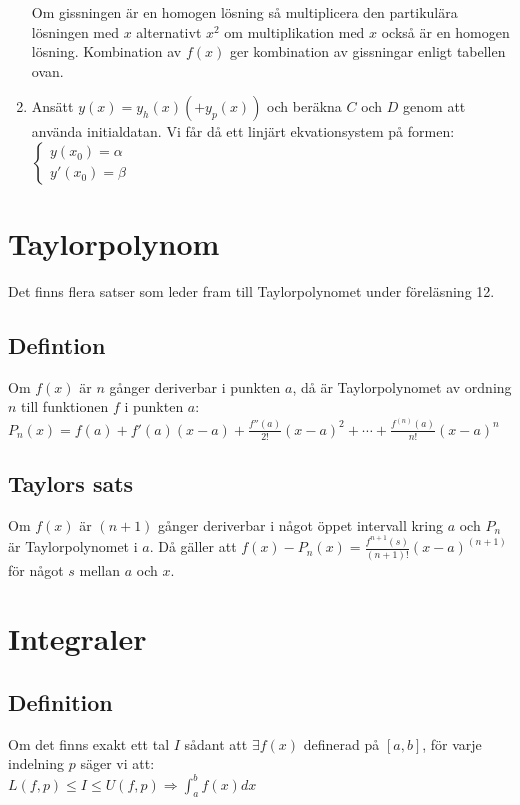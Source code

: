 \documentclass{article}
\begin{document}
\begin{enumerate}
   Om gissningen är en homogen lösning så multiplicera den partikulära lösningen med $x$ alternativt $x^2$ om multiplikation med $x$ också är en homogen lösning. Kombination av $f(x)$ ger kombination av gissningar enligt tabellen ovan.
   \item Ansätt $y(x)=y_{h}(x)(+y_{p}(x))$ och beräkna $C$ och $D$ genom att använda initialdatan. Vi får då ett linjärt ekvationsystem på formen:\\
   $\left\{
   \begin{array}{l}
       y(x_{0})=\alpha \\
       y'(x_{0})=\beta
   \end{array}
   \right.$
\end{enumerate}

\newpage
\section{Taylorpolynom}
Det finns flera satser som leder fram till Taylorpolynomet under föreläsning 12.
\subsection{Defintion}
Om $f(x)$ är $n$ gånger deriverbar i punkten $a$, då är Taylorpolynomet av ordning $n$ till funktionen $f$ i punkten $a$:\\
$P_{n}(x)=f(a)+f'(a)(x-a)+\frac{f''(a)}{2!}(x-a)^2+\cdots+\frac{f^{(n)}(a)}{n!}(x-a)^n$

\subsection{Taylors sats}
Om $f(x)$ är $(n+1)$ gånger deriverbar i något öppet intervall kring $a$ och $P_{n}$ är Taylorpolynomet i $a$. Då gäller att $f(x)-P_{n}(x)=\frac{f^{n+1}(s)}{(n+1)!}(x-a)^{(n+1)}$ för något $s$ mellan $a$ och $x$.

\section{Integraler}
\subsection{Definition}
Om det finns exakt ett tal $I$ sådant att $\exists f(x)$ definerad på $[a,b]$, för varje indelning $p$ säger vi att:\\
${\displaystyle L(f,p)\leq I \leq U(f,p) \Rightarrow \int_{a}^{b}f(x)dx}$
\end{document}
